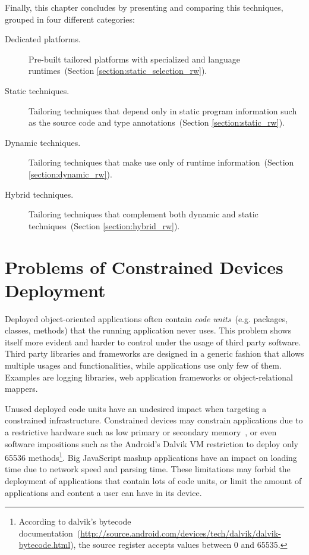 Finally, this chapter concludes by presenting and comparing this techniques, grouped in four different categories: 
\begin{description}
\item[Dedicated platforms.] Pre-built tailored platforms with specialized \VMs and language runtimes~(Section \ref{section:static_selection_rw}).
\item[Static techniques.] Tailoring techniques that depend only in static program information such as the source code and type annotations~(Section \ref{section:static_rw}).
\item[Dynamic techniques.] Tailoring techniques that make use only of runtime information~(Section \ref{section:dynamic_rw}).
\item[Hybrid techniques.] Tailoring techniques that complement both dynamic and static techniques~(Section \ref{section:hybrid_rw}).
\end{description}


\section{Problems of Constrained Devices Deployment}\label{sec:footprint_problems}
Deployed object-oriented applications often contain \emph{code units}~(e.g. packages, classes, methods) that the running application never uses.
This problem shows itself more evident and harder to control under the usage of third party software. 
Third party libraries and frameworks are designed in a generic fashion that allows multiple usages and functionalities, while applications use only few of them. 
Examples are logging libraries, web application frameworks or object-relational mappers.

Unused deployed code units have an undesired impact when targeting a constrained infrastructure. 
Constrained devices may constrain applications due to a restrictive hardware such as low primary or secondary memory~\cite{Mart12a}, or even software impositions such as the Android's Dalvik VM restriction to deploy only 65536 methods\footnote{According to dalvik's bytecode documentation~(\url{http://source.android.com/devices/tech/dalvik/dalvik-bytecode.html}), the source register accepts values between 0 and 65535.}. Big JavaScript mashup applications have an impact on loading time due to network speed and parsing time.
These limitations may forbid the deployment of applications that contain lots of code units, or limit the amount of applications and content a user can have in its device.

